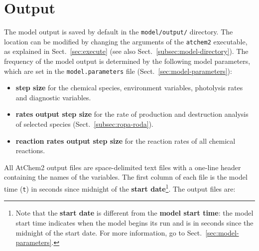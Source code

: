 \section{Output} \label{sec:output}

The model output is saved by default in the \texttt{model/output/} directory. The location can
be modified by changing the arguments of the \texttt{atchem2} executable, as explained in
Sect.~\ref{sec:execute} (see also Sect.~\ref{subsec:model-directory}). The frequency of the
model output is determined by the following model parameters, which are set in the
\texttt{model.parameters} file (Sect.~\ref{sec:model-parameters}):

\begin{itemize}
\item \textbf{step size} for the chemical species, environment variables, photolysis rates and
  diagnostic variables.
\item \textbf{rates output step size} for the rate of production and destruction analysis of
  selected species (Sect.~\ref{subsec:ropa-roda}).
\item \textbf{reaction rates output step size} for the reaction rates of all chemical
  reactions.
\end{itemize}

All AtChem2 output files are space-delimited text files with a one-line header containing the
names of the variables. The first column of each file is the model time (\texttt{t}) in seconds
since midnight of the \textbf{start date}\footnote{Note that the \textbf{start date} is
  different from the \textbf{model start time}: the model start time indicates when the model
  begins its run and is in seconds since the midnight of the start date. For more information,
  go to Sect.~\ref{sec:model-parameters}.}. The output files are:

